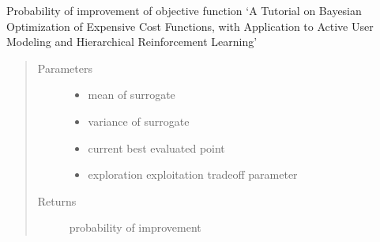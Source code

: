 \documentclass[letterpaper,12pt,english]{sphinxmanual}
\begin{document}
\begin{fulllineitems}
\label{\detokenize{PARyOpt:PARyOpt.acquisition_functions.probability_improvement}}
\sphinxAtStartPar
Probability of improvement of objective function     ‘A Tutorial on Bayesian Optimization of Expensive Cost Functions,     with Application to Active User Modeling and Hierarchical Reinforcement Learning’
\begin{quote}\begin{description}
\item[{Parameters}] \leavevmode\begin{itemize}
\item {} 
\sphinxAtStartPar
{} \textendash{} mean of surrogate

\item {} 
\sphinxAtStartPar
{} \textendash{} variance of surrogate

\item {} 
\sphinxAtStartPar
{} \textendash{} current best evaluated point

\item {} 
\sphinxAtStartPar
{} \textendash{} exploration \sphinxhyphen{} exploitation tradeoff parameter

\end{itemize}

\item[{Returns}] \leavevmode
\sphinxAtStartPar
probability of improvement

\end{description}\end{quote}

\end{fulllineitems}

\end{document}
